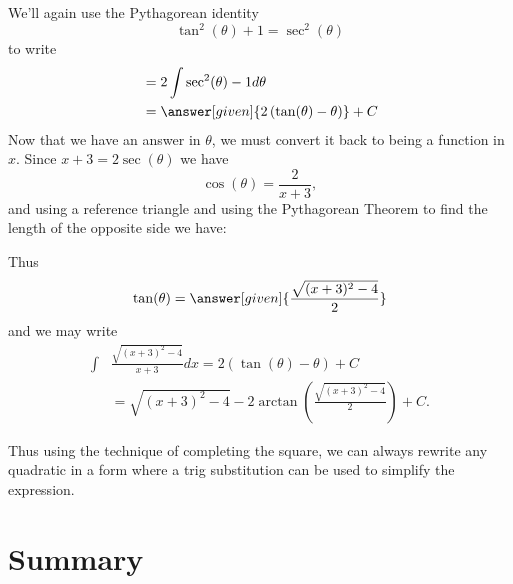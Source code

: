 \documentclass{ximera}
\begin{document}
\begin{example}
\begin{explanation}
    We'll again use the Pythagorean identity
    \[
    \tan^2(\theta) + 1 = \sec^2(\theta)
    \]
    to write
    \begin{align*}
      &= 2\int \sec^2(\theta) - 1 d\theta\\
      &= \answer[given]{2\left(\tan(\theta) - \theta\right)} + C
    \end{align*}
    Now that we have an answer in $\theta$, we must convert it back to
    being a function in $x$. Since $x+3 = 2\sec(\theta)$ we have
    \[
    \cos(\theta) = \frac{2}{x+3},
    \]
    and using a reference triangle and using the Pythagorean Theorem
to find the length of the opposite side we have:
    \begin{image}
    \end{image}
    Thus
    \[
    \tan(\theta) = \answer[given]{\frac{\sqrt{(x+3)^{2}-4}}{2}}
    \]
    and we may write
    \begin{align*}
    \int &\frac{\sqrt{(x+3)^2-4}}{x+3} dx = 2\left(\tan(\theta) - \theta\right) + C\\
      &= \sqrt{(x+3)^{2}-4} - 2\arctan\left(\frac{\sqrt{(x+3)^{2}-4}}{2}\right) + C.
    \end{align*}
  \end{explanation}
\end{example}

Thus using the technique of completing the square, we can always rewrite any quadratic in a form where a trig
substitution can be used to simplify the expression. 



\section{Summary}
\end{document}
